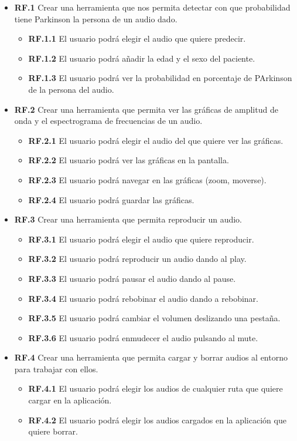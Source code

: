 \begin{itemize}
	\item \textbf{RF.1} Crear una herramienta que nos permita detectar con que probabilidad tiene Parkinson la persona de un audio dado.
	\begin{itemize}
	\item \textbf{RF.1.1} El usuario podrá elegir el audio que  quiere predecir.
	\item \textbf{RF.1.2} El usuario podrá añadir la edad y el sexo del paciente.
	\item \textbf{RF.1.3} El usuario podrá ver la probabilidad en porcentaje de PArkinson de la persona del audio.
	\end{itemize}
	
	\item \textbf{RF.2} Crear una herramienta que permita ver las gráficas de amplitud de onda y el espectrograma de frecuencias de un audio.
	\begin{itemize}
	\item \textbf{RF.2.1} El usuario podrá elegir el audio del que quiere ver las gráficas.
	\item \textbf{RF.2.2} El usuario podrá ver las gráficas en la pantalla.
	\item \textbf{RF.2.3} El usuario podrá navegar en las gráficas (zoom, moverse).
	\item \textbf{RF.2.4} El usuario podrá guardar las gráficas.
	\end{itemize}
	
	\item \textbf{RF.3} Crear una herramienta que permita reproducir un audio.
	\begin{itemize}
	\item \textbf{RF.3.1} El usuario podrá elegir el audio que quiere reproducir.
	\item \textbf{RF.3.2} El usuario podrá reproducir un audio dando al play.
	\item \textbf{RF.3.3} El usuario podrá pausar el audio dando al pause.
	\item \textbf{RF.3.4} El usuario podrá rebobinar el audio dando a rebobinar.
	\item \textbf{RF.3.5} El usuario podrá cambiar el volumen deslizando una pestaña.
	\item \textbf{RF.3.6} El usuario podrá enmudecer el audio pulsando al mute.
	\end{itemize}
	
	\item \textbf{RF.4} Crear una herramienta que permita cargar y borrar audios al entorno para trabajar con ellos.
	\begin{itemize}
	\item \textbf{RF.4.1} El usuario podrá elegir los audios de cualquier ruta que quiere cargar en la aplicación.
	\item \textbf{RF.4.2} El usuario podrá elegir los audios cargados en la aplicación que quiere borrar.
	\end{itemize}
	

\end{itemize}
